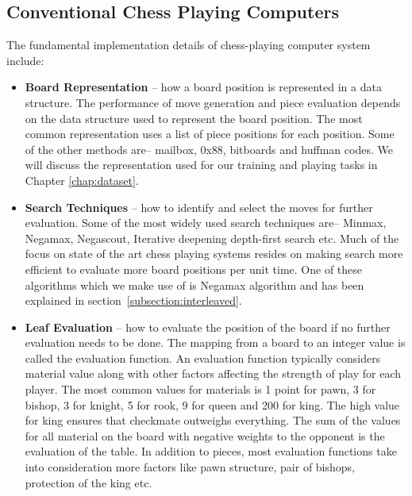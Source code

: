 \subsection{Conventional Chess Playing Computers}
\label{subsection:conventional-chess}
The fundamental implementation details of chess-playing computer system include:
\begin{itemize}
\item \textbf{Board Representation} -- how a board position is represented in a 
data structure. The performance of move generation and piece evaluation depends 
on the data structure used to represent the board position. The most common 
representation uses a list of piece positions for each position. Some of the 
other methods are-- mailbox, 0x88, bitboards and huffman codes. We will discuss 
the representation used for our training and playing tasks in Chapter 
\ref{chap:dataset}.

\item \textbf{Search Techniques} -- how to identify and select the moves for 
further evaluation. Some of the most widely used search techniques are-- 
Minmax, Negamax, Negascout, Iterative deepening depth-first search etc. Much of 
the 
focus on state of the art chess playing systems resides on making search more 
efficient to evaluate more board positions per unit time. One of these 
algorithms which we make use of is Negamax algorithm and has 
been explained in section~\ref{subsection:interleaved}.

\item\textbf{Leaf Evaluation} -- how to evaluate the position of the board if 
no 
further evaluation needs to be done. The mapping from a board to an integer 
value is called the evaluation function. An evaluation function typically 
considers material value along with other factors affecting the strength of 
play for each player. The most common values for materials is 1 point for pawn, 
3 for bishop, 3 for knight, 5 for rook, 9 for queen and 200 for king. The high 
value for king ensures that checkmate outweighs everything. The sum of the 
values for all material on the board with negative weights to the opponent is 
the evaluation of the table. In addition to pieces, most evaluation functions 
take into consideration more factors like pawn structure, pair of bishops, 
protection of the king etc.
\end{itemize}


